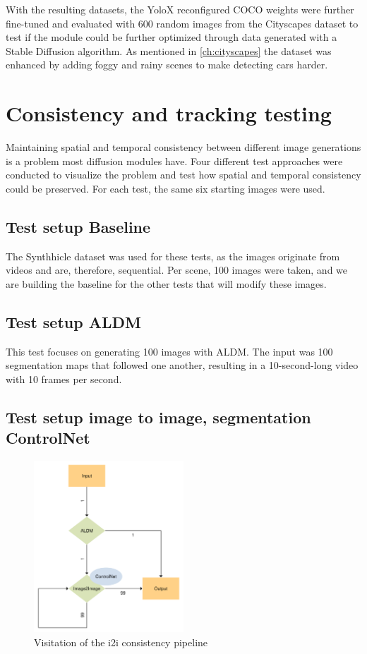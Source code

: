 With the resulting datasets, the YoloX reconfigured COCO weights were further fine-tuned and evaluated with 600 random images from the Cityscapes dataset to test if the module could be further optimized through data generated with a Stable Diffusion algorithm. As mentioned in \autoref{ch:cityscapes} the dataset was enhanced by adding foggy and rainy scenes to make detecting cars harder.

\section{Consistency and tracking testing}
Maintaining spatial and temporal consistency between different image generations is a problem most diffusion modules have. Four different test approaches were conducted to visualize the problem and test how spatial and temporal consistency could be preserved. For each test, the same six starting images were used.

\subsection{Test setup Baseline}
The Synthhicle dataset was used for these tests, as the images originate from videos and are, therefore, sequential. Per scene, 100 images were taken, and we are building the baseline for the other tests that will modify these images.

\subsection{Test setup ALDM}

This test focuses on generating 100 images with ALDM. The input was 100 segmentation maps that followed one another, resulting in a 10-second-long video with 10 frames per second.


\subsection{Test setup image to image, segmentation ControlNet}

\begin{figure}[H]
  \centering
  \includegraphics[width=0.5\textwidth]{figures/own_work/temporal_spacial_consistency/temporal_consistency_i2i_pipeline.pdf}
  \caption{Visitation of the i2i consistency pipeline}
  \label{fig:temporal_consistency_i2i_pipeline}
  \clearpage
\end{figure}

